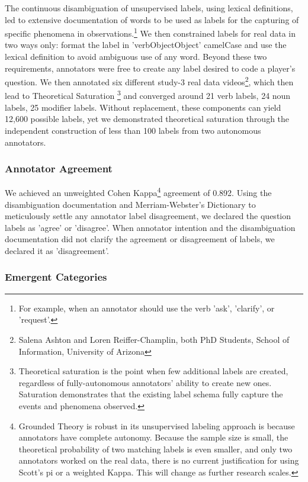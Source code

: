 The continuous disambiguation
of unsupervised labels, using lexical definitions, led to extensive
documentation of words to be used as labels for the capturing of specific
phenomena in observations.\footnote{For example, when an annotator should use
the verb 'ask', 'clarify', or 'request'.} We then constrained labels for real
data in two ways only: format the label in 'verbObjectObject' camelCase and use
the lexical definition to avoid ambiguous use of any word. Beyond these two
requirements, annotators were free to create any label desired to code a
player's question. We then annotated six different study-3 real data
videos\footnote{Salena Ashton and Loren Reiffer-Champlin, both PhD Students, School of Information, University of Arizona}, which then lead to Theoretical
Saturation \footnote{Theoretical saturation is the point when few additional
labels are created, regardless of fully-autonomous annotators' ability to
create new ones. Saturation demonstrates that the existing label schema fully
capture the events and phenomena observed.} and converged around 21 verb
labels, 24 noun labels, 25 modifier labels. Without replacement, these
components can yield 12,600 possible labels, yet we demonstrated theoretical
saturation through the independent construction of less than 100 labels from
two autonomous annotators.


\subsubsection{Annotator Agreement}
We achieved an unweighted Cohen Kappa\footnote{Grounded Theory is robust in its
unsupervised labeling approach is because annotators have complete autonomy.
Because the sample size is small, the theoretical probability of two matching
labels is even smaller, and only two annotators worked on the real data, there
is no current justification for using Scott's pi or a weighted Kappa. This will
change as further research scales.} agreement of 0.892. Using the
disambiguation documentation and Merriam-Webster's Dictionary to meticulously
settle any annotator label disagreement, we declared the question labels as
'agree' or 'disagree'. When annotator intention and the disambiguation
documentation did not clarify the agreement or disagreement of labels, we
declared it as 'disagreement'. 


\subsubsection{Emergent Categories}

